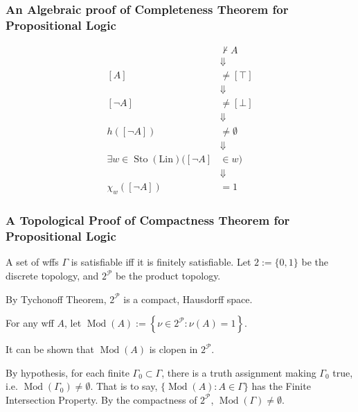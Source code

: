 \documentclass[UTF8,aspectratio=43,11pt,colorlinks,compress,openany]{beamer}%
\begin{document}
\begin{frame}\frametitle{\small An Algebraic proof of Completeness Theorem for Propositional Logic}
\setlength\abovedisplayskip{0pt}
\setlength\belowdisplayskip{0pt}
\begin{align*}
				&\nvdash A\\
				&\Downarrow\\
				[A]&\neq[\top]\\
				&\Downarrow\\
				[\neg A]&\neq[\bot]\\
				&\Downarrow\\
				h\left([\neg A]\right)&\neq\emptyset\\
				&\Downarrow\\
				\exists w\in\operatorname{Sto}(\mathrm{Lin})\big([\neg A]&\in w\big)\\
				&\Downarrow\\
				\chi_w\left([\neg A]\right)&=1
\end{align*}
\end{frame}

\begin{frame}\frametitle{\small A Topological Proof of Compactness Theorem for Propositional Logic}
\begin{block}{A set of wffs $\Gamma$ is satisfiable iff it is finitely satisfiable.}
Let $2:=\{0,1\}$ be the discrete topology, and $2^{\mathcal{P}}$ be the product topology.

By Tychonoff Theorem, $2^{\mathcal{P}}$ is a compact, Hausdorff space.

For any wff $A$, let $\operatorname{Mod}(A):=\left\{\nu\in 2^{\mathcal{P}}: \nu(A)=1\right\}$.

It can be shown that $\operatorname{Mod}(A)$ is clopen in $2^{\mathcal{P}}$.

By hypothesis, for each finite $\Gamma_0\subset\Gamma$, there is a truth assignment making $\Gamma_0$ true, i.e. $\operatorname{Mod}(\Gamma_0)\neq\emptyset$. That is to say, $\{\operatorname{Mod}(A): A\in\Gamma\}$ has the Finite Intersection Property. By the compactness of $2^{\mathcal{P}}$, $\operatorname{Mod}(\Gamma)\neq\emptyset$.
\end{block}
\end{frame}
\end{document}
